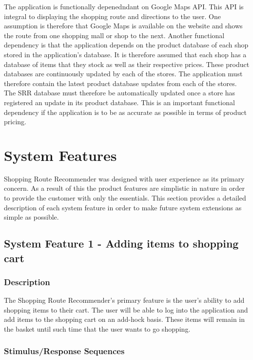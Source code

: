 \documentclass[10pt, a4paper, onecolumn]{scrartcl}
\begin{document}
			The application is functionally depenedndant on Google Maps API. This API is integral to displaying the shopping route and directions to the user. One assumption is therefore that Google Maps is available on the website and shows the route from one shopping mall or shop to the next. Another functional dependency is that the application depends on the product database of each shop stored in the application's database. It is therefore assumed that each shop has a database of items that they stock as well as their respective prices. These product databases are continuously updated by each of the stores. The application must therefore contain the latest product database updates from each of the stores. The SRR database must therefore be automatically updated once a store has registered an update in its product database. This is an important functional dependency if the application is to be as accurate as possible in terms of product pricing. 
	
	\section{System Features}
	
		Shopping Route Recommender was designed with user experience as its primary concern. As a result of this the product features are simplistic in nature in order to provide the customer with only the essentials.	This section provides a detailed description of each system feature in order to make future system extensions as simple as possible. 
	
		\subsection{System Feature 1 - Adding items to shopping cart}
		\label{featureadd}
		
			\subsubsection{Description}
			
				The Shopping Route Recommender's primary feature is the user's ability to add shopping items to their cart. The user will be able to log into the application and add items to the shopping cart on an add-hock basis. These items will remain in the basket until such time that the user wants to go shopping. 
			
			\subsubsection{Stimulus/Response Sequences}
			
\end{document}
